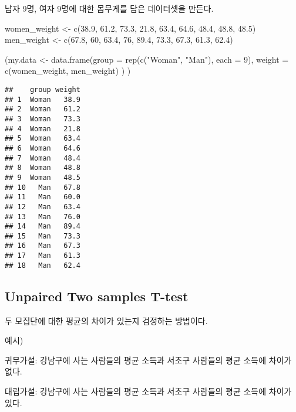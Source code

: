 \documentclass[
]{article}
\newenvironment{Shaded}{\begin{snugshade}}{\end{snugshade}}
\newcommand{\AttributeTok}[1]{\textcolor[rgb]{0.77,0.63,0.00}{#1}}
\newcommand{\DecValTok}[1]{\textcolor[rgb]{0.00,0.00,0.81}{#1}}
\newcommand{\FloatTok}[1]{\textcolor[rgb]{0.00,0.00,0.81}{#1}}
\newcommand{\FunctionTok}[1]{\textcolor[rgb]{0.00,0.00,0.00}{#1}}
\newcommand{\NormalTok}[1]{#1}
\newcommand{\OtherTok}[1]{\textcolor[rgb]{0.56,0.35,0.01}{#1}}
\newcommand{\StringTok}[1]{\textcolor[rgb]{0.31,0.60,0.02}{#1}}
\begin{document}
남자 9명, 여자 9명에 대한 몸무게를 담은 데이터셋을 만든다.

\begin{Shaded}
\begin{Highlighting}[]
\NormalTok{women\_weight }\OtherTok{\textless{}{-}} \FunctionTok{c}\NormalTok{(}\FloatTok{38.9}\NormalTok{, }\FloatTok{61.2}\NormalTok{, }\FloatTok{73.3}\NormalTok{, }\FloatTok{21.8}\NormalTok{, }\FloatTok{63.4}\NormalTok{, }\FloatTok{64.6}\NormalTok{, }\FloatTok{48.4}\NormalTok{, }\FloatTok{48.8}\NormalTok{, }\FloatTok{48.5}\NormalTok{)}
\NormalTok{men\_weight }\OtherTok{\textless{}{-}} \FunctionTok{c}\NormalTok{(}\FloatTok{67.8}\NormalTok{, }\DecValTok{60}\NormalTok{, }\FloatTok{63.4}\NormalTok{, }\DecValTok{76}\NormalTok{, }\FloatTok{89.4}\NormalTok{, }\FloatTok{73.3}\NormalTok{, }\FloatTok{67.3}\NormalTok{, }\FloatTok{61.3}\NormalTok{, }\FloatTok{62.4}\NormalTok{)}
    
\NormalTok{(my.data }\OtherTok{\textless{}{-}} \FunctionTok{data.frame}\NormalTok{(}\AttributeTok{group =} \FunctionTok{rep}\NormalTok{(}\FunctionTok{c}\NormalTok{(}\StringTok{"Woman"}\NormalTok{, }\StringTok{"Man"}\NormalTok{), }\AttributeTok{each =} \DecValTok{9}\NormalTok{), }\AttributeTok{weight =} \FunctionTok{c}\NormalTok{(women\_weight,  men\_weight) ) )}
\end{Highlighting}
\end{Shaded}

\begin{verbatim}
##    group weight
## 1  Woman   38.9
## 2  Woman   61.2
## 3  Woman   73.3
## 4  Woman   21.8
## 5  Woman   63.4
## 6  Woman   64.6
## 7  Woman   48.4
## 8  Woman   48.8
## 9  Woman   48.5
## 10   Man   67.8
## 11   Man   60.0
## 12   Man   63.4
## 13   Man   76.0
## 14   Man   89.4
## 15   Man   73.3
## 16   Man   67.3
## 17   Man   61.3
## 18   Man   62.4
\end{verbatim}

\hypertarget{unpaired-two-samples-t-test-1}{%
\subsection{Unpaired Two samples T-test}\label{unpaired-two-samples-t-test-1}}

두 모집단에 대한 평균의 차이가 있는지 검정하는 방법이다.

예시)

귀무가설: 강남구에 사는 사람들의 평균 소득과 서초구 사람들의 평균 소득에 차이가 없다.

대립가설: 강남구에 사는 사람들의 평균 소득과 서초구 사람들의 평균 소득에 차이가 있다.
\end{document}
